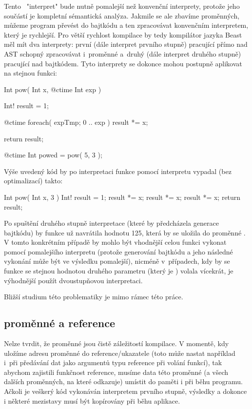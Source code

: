 Tento \ctime~"interpret" bude nutně pomalejší než konvenční interprety, protože jeho součástí je kompletní sémantická analýza. Jakmile se ale zbavíme \ctime proměnných, můžeme program převést do bajtkódu a ten zpracovávat konvenčním interpretem, který je rychlejší. Pro větší rychlost kompilace by tedy kompilátor jazyka Beast měl mít dva interprety: první (dále interpret prvního stupně) pracující přímo nad AST schopný zpracovávat i~\ctime proměnné a~druhý (dále interpret druhého stupně) pracující nad bajtkódem. Tyto interprety se dokonce mohou postupně aplikovat na stejnou funkci:

\begin{code}
Int pow( Int x, @ctime Int exp ) {
	Int! result = 1;
	
	@ctime foreach( expTmp; 0 .. exp )
		result *= x;
		
	return result;
}

@ctime Int powed = pow( 5, 3 );
\end{code}

Výše uvedený kód by po interpretaci funkce  pomocí \ctime interpretu vypadal (bez optimalizací) takto:

\begin{code}
Int pow( Int x, 3 ) {
	Int! result = 1;
	result *= x;
	result *= x;
	result *= x;
	return result;
}
\end{code}

Po spuštění druhého stupně interpretace (které by předcházela generace bajtkódu) by funkce už navrátila hodnotu 125, která by se uložila do proměnné . V tomto konkrétním případě by mohlo být vhodnější celou funkci vykonat pomocí pomalejšího \ctime interpretu (protože generování bajtkódu a jeho následné vykonání může být ve výsledku pomalejší), nicméně v~případech, kdy by se funkce  se stejnou hodnotou druhého parametru (který je \ctime) volala vícekrát, je výhodnější použít dvoustupňovou interpretaci.

Bližší studium této problematiky je mimo rámec této práce. %

\subsection{\ctime proměnné a \nonctime reference} \label{ctime:impl:ref}
Nelze tvrdit, že \ctime proměnné jsou čistě záležitostí kompilace. V momentě, kdy uložíme adresu \ctime proměnné do \nonctime reference/ukazatele (toto může nastat například i~při předávání \ctime dat jako argumentů typu reference při volání \nonctime funkcí), tak abychom zajistili funkčnost reference, musíme data této proměnné (a všech dalších proměnných, na které odkazuje) umístit do paměti i při běhu programu. Ačkoli je veškerý \ctime kód vykonáván interpretem prvního stupně, výsledky a dokonce i některé mezistavy musí být kopírovány při běhu aplikace.

